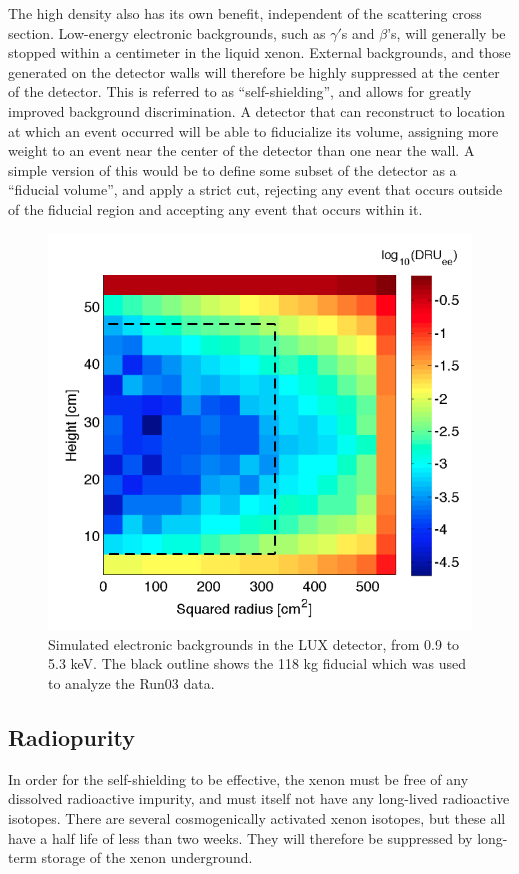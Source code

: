 The high density also has its own benefit, independent of the scattering cross section. Low-energy electronic backgrounds, such as $\gamma'$s and $\beta$'s, will generally be stopped within a centimeter in the liquid xenon. External backgrounds, and those generated on the detector walls will therefore be highly suppressed at the center of the detector. This is referred to as ``self-shielding'', and allows for greatly improved background discrimination. A detector that can reconstruct to location at which an event occurred will be able to fiducialize its volume, assigning more weight to an event near the center of the detector than one near the wall. A simple version of this would be to define some subset of the detector as a ``fiducial volume'', and apply a strict cut, rejecting any event that occurs outside of the fiducial region and accepting any event that occurs within it.
\begin{figure}[h!]
\centering
\includegraphics[width=\linewidth]{Figures/lux_fiducial.png}
\caption{Simulated electronic backgrounds in the LUX detector, from 0.9 to 5.3 keV. The black outline shows the 118 kg fiducial which was used to analyze the Run03 data.\cite{lux_fiducial}}
\label{fig:lux_fiducial} 
\end{figure}

\clearpage
\subsection{Radiopurity}
In order for the self-shielding to be effective, the xenon must be free of any dissolved radioactive impurity, and must itself not have any long-lived radioactive isotopes. There are several cosmogenically activated xenon isotopes, but these all have a half life of less than two weeks. They will therefore be suppressed by long-term storage of the xenon underground.

